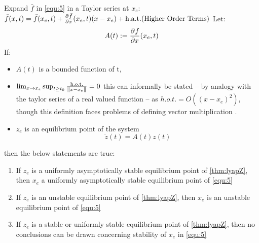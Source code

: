 {
    Expand $\bar{f}$ in \ref{equ:5} in a Taylor series at $x_e$: \\
    $\bar{f}(x,t) = \bar{f}(x_e,t)+ \frac{\partial^{}\bar{f}}{\partial x^{}}(x_e,t)(x-x_e) + \text{h.a.t.(Higher Order Terms)} $
    Let:
    \begin{equation}
        A(t) := \frac{\partial^{}f}{\partial x^{}}(x_e,t)
        \label{thm:lyapA}
    \end{equation}
If:
\begin{itemize}
        \item $A(t)$ is a bounded function of t,
    \item  $\lim_{x \to x_e} \sup_{t \ge t_0} \frac{\text{h.o.t.}}{\lVert x-x_e\rVert} = 0$ this can informally be stated -- by analogy with the taylor series of a real valued function -- as $h.o.t. = O((x-x_e)^2)$, though this definition faces problems of defining vector multiplication .
        \item $z_e$ is an equilibrium point of the system 
             \begin{equation}
                \label{thm:lyapZ}
                \dot{z}(t) = A(t)z(t)
            \end{equation}
\end{itemize}
then the below statements are true:
\begin{enumerate}
    \item If  $z_e$ is a uniformly asymptotically stable equilibrium point of \ref{thm:lyapZ}, then $x_e$ a uniformly asymptotically stable equilibrium point of \ref{equ:5}
    \item If $z_e$ is an unstable equilibrium point of  \ref{thm:lyapZ}, then $x_e$ is an unstable equilibrium point of \ref{equ:5}
    \item If $z_e$ is a stable or uniformly stable equilibrium point of \ref{thm:lyapZ}, then no conclusions can be drawn concerning stability of $x_e$ in  \ref{equ:5}
\end{enumerate}

}
